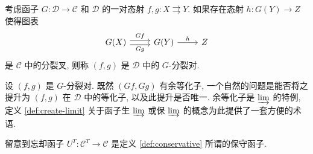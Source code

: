 \begin{definition}\label{def:Beck-split-pair}
	考虑函子 $G: \mathcal{D}\to \mathcal{C}$ 和 $\mathcal{D}$ 的一对态射 $f, g: X \rightrightarrows Y$. 如果存在态射 $h: G(Y) \to Z$ 使得图表
	\begin{equation*}\begin{tikzcd}
			G(X) \arrow[shift left, r, "Gf"] \arrow[shift right, r, "Gg"'] & G(Y) \arrow[r, "h"] & Z
	\end{tikzcd}\end{equation*}
	是 $\mathcal{C}$ 中的分裂叉, 则称 $(f, g)$ 是 $\mathcal{D}$ 中的 $G$-分裂对.
\end{definition}

设 $(f, g)$ 是 $G$-分裂对. 既然 $(Gf, Gg)$ 有余等化子, 一个自然的问题是能否将之提升为 $(f, g)$ 在 $\mathcal{D}$ 中的等化子, 以及此提升是否唯一. 余等化子是 $\varinjlim$ 的特例, 定义 \ref{def:create-limit} 关于函子生 $\varinjlim$ 或保 $\varinjlim$ 的概念为此提供了一套方便的术语.

留意到忘却函子 $U^T: \mathcal{C}^T \to \mathcal{C}$ 是定义 \ref{def:conservative} 所谓的保守函子.

